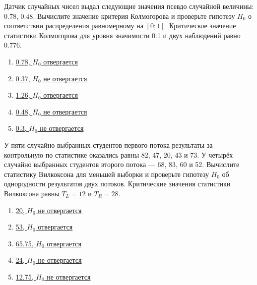 \documentclass[t]{beamer}
\begin{document}
 \begin{frame} \label{29} 
\begin{block}{29} 

Датчик случайных чисел выдал следующие значения псевдо случайной величины: $0.78$, $0.48$. Вычислите значение критерия Колмогорова и проверьте гипотезу $H_0$ о соответствии распределения равномерному на $[0;1]$. Критическое значение статистики Колмогорова для уровня значимости 0.1 и двух наблюдений равно $0.776$.
 


 \end{block} 
\begin{enumerate} 
\item[] \hyperlink{29-No}{\beamergotobutton{} 0.78, $H_0$ отвергается}
\item[] \hyperlink{29-No}{\beamergotobutton{} 0.37, $H_0$ не отвергается}
\item[] \hyperlink{29-No}{\beamergotobutton{} 1.26, $H_0$ отвергается}
\item[] \hyperlink{29-Yes}{\beamergotobutton{} 0.48, $H_0$ не отвергается}
\item[] \hyperlink{29-No}{\beamergotobutton{} 0.3, $H_0$ не отвергается}
\end{enumerate} 
\end{frame} 


 \begin{frame} \label{30} 
\begin{block}{30} 

У пяти случайно выбранных студентов первого потока результаты за контрольную по статистике оказались равны  82, 47, 20, 43 и 73. У четырёх случайно выбранных студентов второго потока — 68, 83, 60 и 52. Вычислите статистику Вилкоксона для меньшей выборки и проверьте гипотезу $H_0$ об однородности результатов  двух потоков. Критические значения статистики Вилкоксона равны $T_L=12$ и $T_R=28$.
 


 \end{block} 
\begin{enumerate} 
\item[] \hyperlink{30-No}{\beamergotobutton{} 20, $H_0$ не отвергается}
\item[] \hyperlink{30-No}{\beamergotobutton{} 53, $H_0$ отвергается}
\item[] \hyperlink{30-No}{\beamergotobutton{} 65.75, $H_0$ отвергается}
\item[] \hyperlink{30-Yes}{\beamergotobutton{} 24, $H_0$ не отвергается}
\item[] \hyperlink{30-No}{\beamergotobutton{} 12.75, $H_0$ не отвергается}
\end{enumerate} 
\end{frame} 
\end{document}
